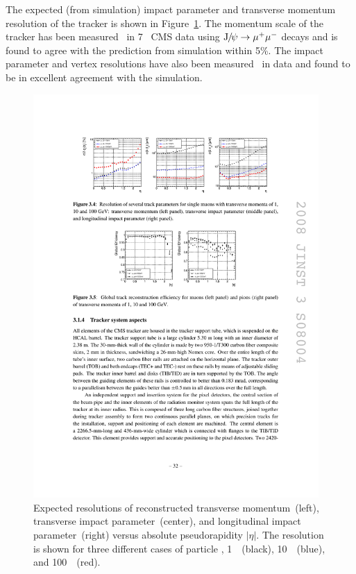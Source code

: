 The expected (from simulation) impact parameter and transverse momentum
resolution of the tracker is shown in Figure~\ref{fig:ExpectedTrackerRes}.  The
momentum scale of the tracker has been measured~\cite{CMS-PAS-TRK-10-004} in
7~ CMS data using $\mathrm{J}\hspace{-.08em}/\hspace{-.14em}\psi \to \mu^+\mu^-$ decays and is found to agree with the
prediction from simulation within 5\%. The impact parameter and vertex
resolutions have also been measured~\cite{CMS-PAS-TRK-10-005} in data and found
to be in excellent agreement with the simulation.
\begin{figure}
  \centering
  \includegraphics[width=0.97\textwidth]{detector_chapter/figures/predicted_momentum_resolution.pdf}
  \caption[Momentum and impact parameter resolutions of CMS tracker]{Expected
  resolutions of reconstructed transverse momentum~(left), transverse impact
  parameter~(center), and longitudinal impact parameter~(right) versus absolute
  pseudorapidity $|\eta|$. The resolution is shown for three different cases of
  particle \pt, 1~\GeVc~(black), 10~\GeVc~(blue), and 100~\GeVc~(red).}
  \label{fig:ExpectedTrackerRes}
\end{figure}

